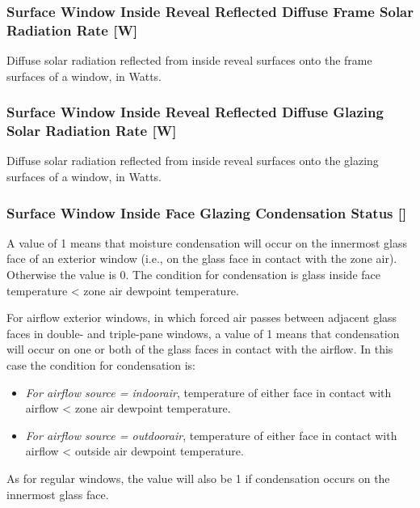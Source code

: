\subsubsection{Surface Window Inside Reveal Reflected Diffuse Frame Solar Radiation Rate {[}W{]}}\label{surface-window-inside-reveal-reflected-diffuse-frame-solar-radiation-rate-w}

Diffuse solar radiation reflected from inside reveal surfaces onto the frame surfaces of a window, in Watts.

\subsubsection{Surface Window Inside Reveal Reflected Diffuse Glazing Solar Radiation Rate {[}W{]}}\label{surface-window-inside-reveal-reflected-diffuse-glazing-solar-radiation-rate-w}

Diffuse solar radiation reflected from inside reveal surfaces onto the glazing surfaces of a window, in Watts.

\subsubsection{Surface Window Inside Face Glazing Condensation Status {[]}}\label{surface-window-inside-face-glazing-condensation-status}

A value of 1 means that moisture condensation will occur on the innermost glass face of an exterior window (i.e., on the glass face in contact with the zone air). Otherwise the value is 0. The condition for condensation is glass inside face temperature \textless{} zone air dewpoint temperature.

For airflow exterior windows, in which forced air passes between adjacent glass faces in double- and triple-pane windows, a value of 1 means that condensation will occur on one or both of the glass faces in contact with the airflow. In this case the condition for condensation is:

\begin{itemize}
\item
  \emph{For airflow source = indoorair}, temperature of either face in contact with airflow \textless{} zone air dewpoint temperature.
\item
  \emph{For airflow source = outdoorair}, temperature of either face in contact with airflow \textless{} outside air dewpoint temperature.
\end{itemize}

As for regular windows, the value will also be 1 if condensation occurs on the innermost glass face.

